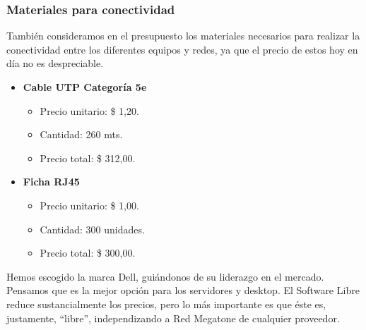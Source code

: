 \subsubsection{Materiales para conectividad}
También consideramos en el presupuesto los materiales necesarios para realizar la conectividad entre los diferentes equipos y redes, ya que el precio de estos hoy en día no es despreciable.

\begin{itemize}
\item \textbf{Cable UTP Categoría 5e}
  \begin{itemize}
    \item Precio unitario: \$ 1,20.
    \item Cantidad: 260 mts.
    \item Precio total: \$ 312,00.
  \end{itemize}

\item \textbf{Ficha RJ45}
  \begin{itemize}
    \item Precio unitario: \$ 1,00.
    \item Cantidad: 300 unidades.
    \item Precio total: \$ 300,00.
  \end{itemize}

\end{itemize}

\vspace{0.5cm}
\vspace{0.5cm}

Hemos escogido la marca Dell, guiándonos de su liderazgo en el mercado.
Pensamos que es la mejor opción para los servidores y desktop. El Software
Libre reduce sustancialmente los precios, pero lo más importante es que éste
es, justamente, ``libre'', independizando a Red Megatone de cualquier
proveedor.

\pagebreak
